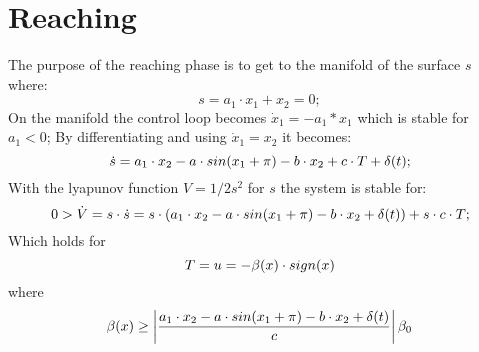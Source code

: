 \chapter{Reaching}

The purpose of the reaching phase is to get to the manifold of the surface $s $ where:
\begin{equation}
s = a_1 \cdot x_1 + x_2 = 0;
\end{equation}
On the manifold the control loop becomes $ \dot{x}_1 = - a_1 *x_1   $ which is stable for $ a_1< 0$;
By differentiating and using $ \dot{x}_1 = x_2 $ it becomes:
\begin{equation}
\dot{s} = a_1 \cdot x_2 - a \cdot sin(x_1 + \pi) - b \cdot x_2 + c \cdot T + \delta (t);
\end{equation}
With the lyapunov function $V = 1/2 s^2 $ for $ s $ the system is stable for:
\begin{equation}
 0 > \dot{V} = s\cdot \dot{s} =  s \cdot (a_1 \cdot x_2 - a \cdot sin(x_1 + \pi) - b \cdot x_2  + \delta (t) ) + s \cdot c \cdot T;
\end{equation}
Which holds for
\begin{equation}
T = u = -\beta (x) \cdot sign(x)
\end{equation}
where
\begin{equation}
\beta (x) \geq \left| \frac{a_1 \cdot x_2 - a \cdot sin(x_1 + \pi) - b \cdot x_2  + \delta (t)}{c} \right| \beta_0
\end{equation}
